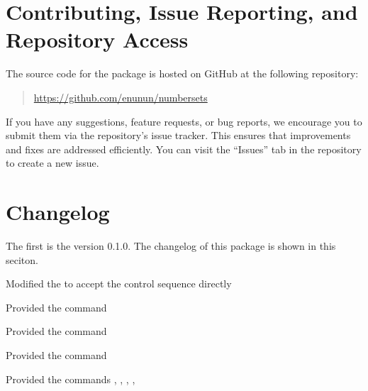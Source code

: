\documentclass{l3doc}
\begin{document}
\section{Contributing, Issue Reporting, and Repository Access}

The source code for the \ThisPackageName{} package is hosted on GitHub at the following repository:
\begin{quote}
	\url{https://github.com/enunun/numbersets}
\end{quote}

If you have any suggestions, feature requests, or bug reports,
we encourage you to submit them via the repository's issue tracker.
This ensures that improvements and fixes are addressed efficiently. You can visit the ``Issues'' tab in the repository to create a new issue.

\section{Changelog}

The first is the version 0.1.0. The changelog of this package is shown in this seciton.

\begin{changelog}[section=false]
	\begin{version}[v=0.2.0, date=2024-10-15]
		\changed
		\item Modified the  to accept the control sequence directly
	\end{version}
	\begin{version}[v=0.1.0, date=2024-10-13]
		\added
		\item Provided the  command
		\item Provided the  command
		\item Provided the  command
		\item Provided the commands , , , , 
	\end{version}
\end{changelog}

\printindex
\end{document}
